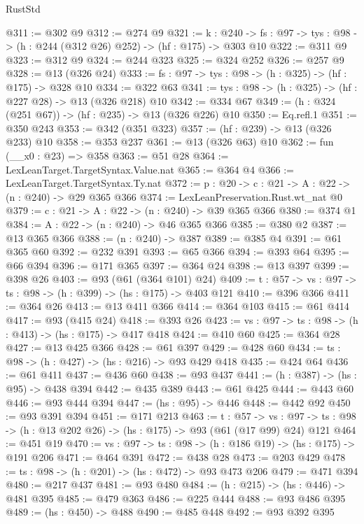\begin{lexlean}{RustStd}
\begin{coremodule}
{\begin{coremodule}
{{{{{{{{{@311 := @302 @9
@312 := @274 @9
@321 := {k : @240} ->
  {fs : @97} -> {tys : @98} -> (h : @244 (@312 @26) @252) -> (hf : @175) -> @303 @10
@322 := @311 @9
@323 := @312 @9
@324 := @244 @323
@325 := @324 @252
@326 := @257 @9
@328 := @13 (@326 @24)
@333 := {fs : @97} -> {tys : @98} -> (h : @325) -> (hf : @175) -> @328 @10
@334 := @322 @63
@341 := {tys : @98} -> (h : @325) -> (hf : @227 @28) -> @13 (@326 @218) @10
@342 := @334 @67
@349 := (h : @324 (@251 @67)) -> (hf : @235) -> @13 (@326 @226) @10
@350 := Eq.refl.{1}
@351 := @350 @243
@353 := @342 (@351 @323)
@357 := (hf : @239) -> @13 (@326 @233) @10
@358 := @353 @237
@361 := @13 (@326 @63) @10
@362 := fun (__x0 : @23) => @358
@363 := @51 @28
@364 := LexLeanTarget.TargetSyntax.Value.nat
@365 := @364 @4
@366 := LexLeanTarget.TargetSyntax.Ty.nat
@372 := {p : @20} -> {c : @21} -> {A : @22} -> (n : @240) -> @29 @365 @366
@374 := LexLeanPreservation.Rust.wt_nat @0
@379 := {c : @21} -> {A : @22} -> (n : @240) -> @39 @365 @366
@380 := @374 @1
@384 := {A : @22} -> (n : @240) -> @46 @365 @366
@385 := @380 @2
@387 := @13 @365 @366
@388 := (n : @240) -> @387
@389 := @385 @4
@391 := @61 @365 @60
@392 := @232 @391
@393 := @65 @366
@394 := @393 @64
@395 := @66 @394
@396 := @171 @365
@397 := @364 @24
@398 := @13 @397
@399 := @398 @26
@403 := @93 (@61 (@364 @101) @24)
@409 := {t : @57} -> {vs : @97} -> {ts : @98} -> (h : @399) -> (hs : @175) -> @403 @121
@410 := @396 @366
@411 := @364 @26
@413 := @13 @411 @366
@414 := @364 @103
@415 := @61 @414
@417 := @93 (@415 @24)
@418 := @393 @26
@423 := {vs : @97} -> {ts : @98} -> (h : @413) -> (hs : @175) -> @417 @418
@424 := @410 @60
@425 := @364 @28
@427 := @13 @425 @366
@428 := @61 @397
@429 := @428 @60
@434 := {ts : @98} -> (h : @427) -> (hs : @216) -> @93 @429 @418
@435 := @424 @64
@436 := @61 @411
@437 := @436 @60
@438 := @93 @437
@441 := (h : @387) -> (hs : @95) -> @438 @394
@442 := @435 @389
@443 := @61 @425
@444 := @443 @60
@446 := @93 @444 @394
@447 := (hs : @95) -> @446
@448 := @442 @92
@450 := @93 @391 @394
@451 := @171 @213
@463 := {t : @57} ->
  {vs : @97} -> {ts : @98} -> (h : @13 @202 @26) -> (hs : @175) -> @93 (@61 (@17 @99) @24) @121
@464 := @451 @19
@470 := {vs : @97} -> {ts : @98} -> (h : @186 @19) -> (hs : @175) -> @191 @206
@471 := @464 @391
@472 := @438 @28
@473 := @203 @429
@478 := {ts : @98} -> (h : @201) -> (hs : @472) -> @93 @473 @206
@479 := @471 @394
@480 := @217 @437
@481 := @93 @480
@484 := (h : @215) -> (hs : @446) -> @481 @395
@485 := @479 @363
@486 := @225 @444
@488 := @93 @486 @395
@489 := (hs : @450) -> @488
@490 := @485 @448
@492 := @93 @392 @395
}}}}}}}}}
\end{coremodule}}
\end{coremodule}
\end{lexlean}

